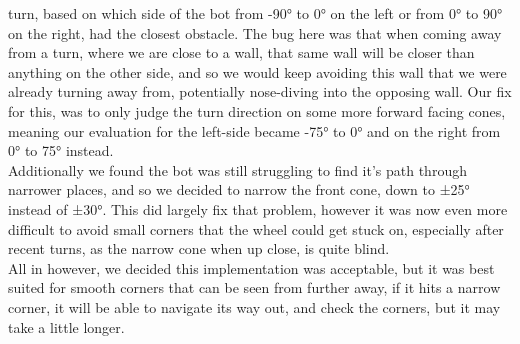 \documentclass[conference]{IEEEtran}
\begin{document}
turn, based on which side of the bot from -90° to 0° on the left or from 0° to 90° on the right, had the closest obstacle.
The bug here was that when coming away from a turn, where we are close to a wall, that same wall will be closer than anything on the
other side, and so we would keep avoiding this wall that we were already turning away from, potentially nose-diving into the opposing wall.
Our fix for this, was to only judge the turn direction on some more forward facing cones, meaning our evaluation for the left-side
became -75° to 0° and on the right from 0° to 75° instead. \\
Additionally we found the bot was still struggling to find it's path through narrower places, and so we decided to narrow the
front cone, down to ±25° instead of ±30°. This did largely fix that problem, however it was now even more difficult to avoid small
corners that the wheel could get stuck on, especially after recent turns, as the narrow cone when up close, is quite blind. \\
All in however, we decided this implementation was acceptable, but it was best suited for smooth corners that can be seen from 
further away, if it hits a narrow corner, it will be able to navigate its way out, and check the corners, but it may take a little
longer.
\\\\
\end{document}
